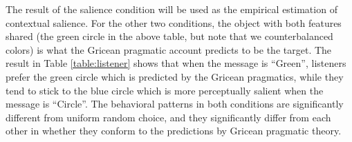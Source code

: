 The result of the salience condition will be used as the empirical
estimation of contextual salience. For the other two conditions, the
object with both features shared (the green circle in the above table,
but note that we counterbalanced colors) is what the Gricean pragmatic
account predicts to be the target. The result in Table
\ref{table:listener} shows that when the message is ``Green'',
listeners prefer the green circle which is predicted by the Gricean
pragmatics, while they tend to stick to the blue circle which is more
perceptually salient when the message is ``Circle''. The behavioral
patterns in both conditions are significantly different from uniform
random choice, and they significantly differ from each other in
whether they conform to the predictions by Gricean pragmatic theory.

